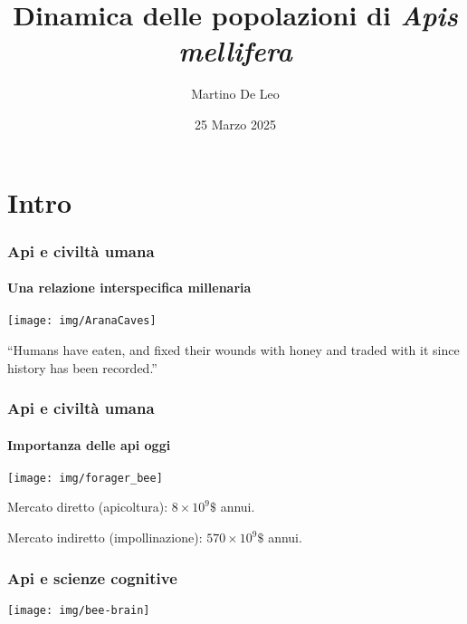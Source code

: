 \documentclass[]{beamer}
\title{Dinamica delle popolazioni di \emph{Apis mellifera}}
\author[]{Martino De Leo}
\date{25 Marzo 2025}
\begin{document}

\section{Intro}


\begin{frame}
    \maketitle
\end{frame}


\begin{frame}
    \frametitle{Api e civiltà umana}
    \framesubtitle{Una relazione interspecifica millenaria}

    \begin{center}
        \texttt{[image: img/AranaCaves]}
    \end{center}

    \begin{displayquote}
        ``Humans have eaten, and fixed their wounds with honey and traded with it since history has been recorded.''
    \end{displayquote}
\end{frame}


\begin{frame}
    \frametitle{Api e civiltà umana}
    \framesubtitle{Importanza delle api oggi}

    \begin{center}
        \texttt{[image: img/forager\_bee]}
    \end{center}

    Mercato diretto (apicoltura): $8 \times 10^9 \$$ annui.

    \pause
    Mercato indiretto (impollinazione): $570 \times 10^9 \$$ annui.
\end{frame}

\begin{frame}
    \frametitle{Api e scienze cognitive}

    \begin{center}
        \texttt{[image: img/bee-brain]}
    \end{center}
\end{frame}
\end{document}
